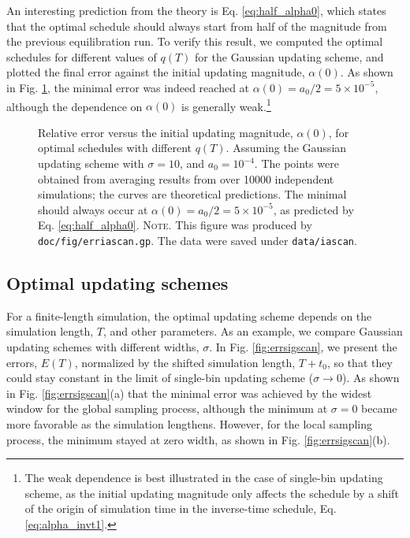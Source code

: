 \documentclass[reprint, superscriptaddress, floatfix]{revtex4-1}
\newcommand{\note}[1]{{\color{DarkGreen}\footnotesize \textsc{Note.} #1}}
\newcommand{\Err}{E}
\begin{document}
An interesting prediction from the theory is Eq. \eqref{eq:half_alpha0},
which states that the optimal schedule should always start from
half of the magnitude from the previous equilibration run.
%
To verify this result,
we computed the optimal schedules
for different values of $q(T)$
for the Gaussian updating scheme,
and plotted the final error
against the initial updating magnitude, $\alpha(0)$.
%
As shown in Fig. \ref{fig:erriascan},
the minimal error was indeed reached at
$\alpha(0) = a_0/2 = 5 \times 10^{-5}$,
although the dependence on $\alpha(0)$
is generally weak.\footnote{The weak dependence is best illustrated in
the case of single-bin updating scheme,
as the initial updating magnitude only
affects the schedule by a shift of the origin of
simulation time in the inverse-time schedule,
Eq. \eqref{eq:alpha_invt1}.}


\begin{figure}[h]
\begin{center}
  \caption{
    \label{fig:erriascan}
    Relative error
    versus the initial updating magnitude, $\alpha(0)$,
    for optimal schedules with different $q(T)$.
    Assuming the Gaussian updating scheme
    with $\sigma = 10$,
    and $a_0 = 10^{-4}$.
    The points were obtained from averaging results
    from over 10000 independent simulations;
    the curves are theoretical predictions.
    The minimal should always occur at
    $\alpha(0) = a_0/2 = 5 \times 10^{-5}$,
    as predicted by Eq. \eqref{eq:half_alpha0}.
    \note{This figure was produced by
      \texttt{doc/fig/erriascan.gp}.
      The data were saved under
      \texttt{data/iascan}.
    }%
  }
\end{center}
\end{figure}






\subsection{\label{sec:results_cmpschemes}
Optimal updating schemes}



For a finite-length simulation,
the optimal updating scheme
depends on the simulation length, $T$,
and other parameters.
%
As an example,
we compare Gaussian updating schemes
with different widths, $\sigma$.
%
In Fig. \ref{fig:errsigscan},
we present the errors, $\Err(T)$,
normalized by the shifted simulation length, $T+t_0$,
so that they could
stay constant in the limit of single-bin updating scheme
($\sigma \to 0$).
%
As shown in Fig. \ref{fig:errsigscan}(a)
that the minimal error was achieved
by the widest window %
for the global sampling process,
%
although
the minimum at $\sigma = 0$ became more favorable
as the simulation lengthens.
%
However,
for the local sampling process,
the minimum stayed at zero width,
as shown in Fig. \ref{fig:errsigscan}(b).
\end{document}
